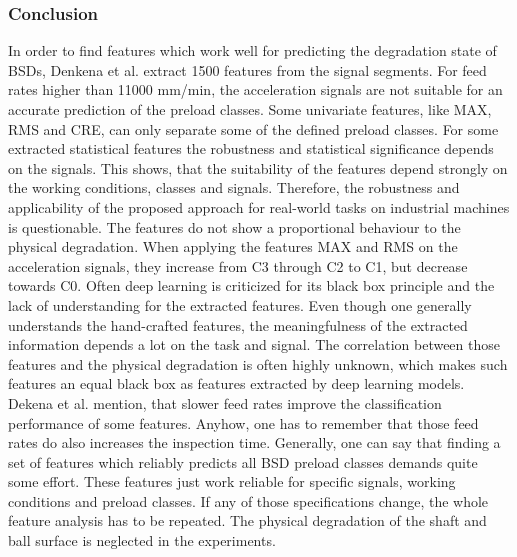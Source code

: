 \subsubsection{Conclusion}
In order to find features which work well for predicting the degradation state of BSDs, Denkena et al. \cite{Denkena2021} extract 1500 features from the signal segments. For feed rates higher than 11000 mm/min, the acceleration signals are not suitable for an accurate prediction of the preload classes. Some univariate features, like MAX, RMS and CRE, can only separate some of the defined preload classes. For some extracted statistical features the robustness and statistical significance depends on the signals. This shows, that the suitability of the features depend strongly on the working conditions, classes and signals. Therefore, the robustness and applicability of the proposed approach for real-world tasks on industrial machines is questionable. The features do not show a proportional behaviour to the physical degradation. When applying the features MAX and RMS on the acceleration signals, they increase from C3 through C2 to C1, but decrease towards C0. Often deep learning is criticized for its black box principle and the lack of understanding for the extracted features. Even though one generally understands the hand-crafted features, the meaningfulness of the extracted information depends a lot on the task and signal. The correlation between those features and the physical degradation is often highly unknown, which makes such features an equal black box as features extracted by deep learning models. Dekena et al. \cite{Denkena2021} mention, that slower feed rates improve the classification performance of some features. Anyhow, one has to remember that those feed rates do also increases the inspection time. Generally, one can say that finding a set of features which reliably predicts all BSD preload classes demands quite some effort. These features just work reliable for specific signals, working conditions and preload classes. If any of those specifications change, the whole feature analysis has to be repeated. The physical degradation of the shaft and ball surface is neglected in the experiments.

